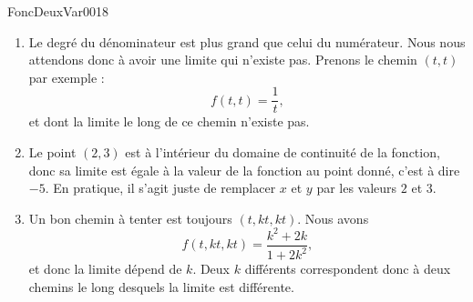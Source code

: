 
\begin{corrige}{FoncDeuxVar0018}

	\begin{enumerate}

		\item	%
			Le degré du dénominateur est plus grand que celui du numérateur. Nous nous attendons donc à avoir une limite qui n'existe pas. Prenons le chemin $(t,t)$ par exemple :
			\begin{equation}
				f(t,t)=\frac{1}{ t },
			\end{equation}
			et dont la limite le long de ce chemin n'existe pas.
		\item 	%
			Le point $(2,3)$ est à l'intérieur du domaine de continuité de la fonction, donc sa limite est égale à la valeur de la fonction au point donné, c'est à dire $-5$. En pratique, il s'agit juste de remplacer $x$ et $y$ par les valeurs $2$ et $3$.

		\item	%
			Un bon chemin à tenter est toujours $(t,kt,kt)$. Nous avons
			\begin{equation}
				f(t,kt,kt)=\frac{ k^2+2k }{ 1+2k^2 },
			\end{equation}
			et donc la limite dépend de $k$. Deux $k$ différents correspondent donc à deux chemins le long desquels la limite est différente.


\end{enumerate}
\end{corrige}
